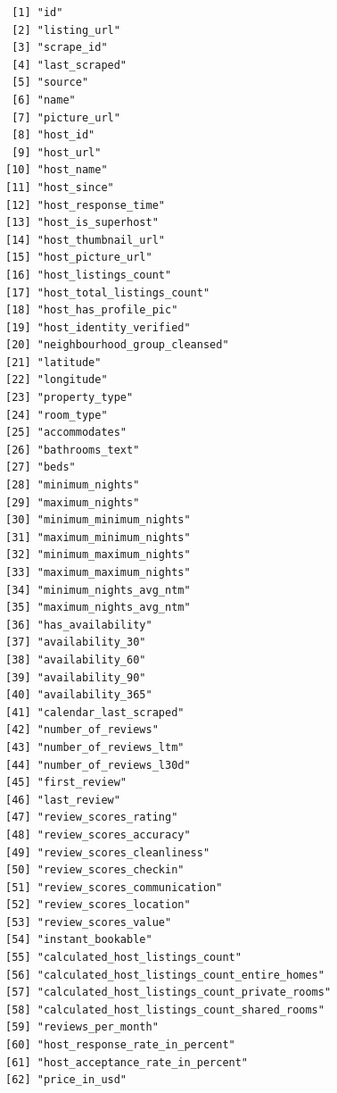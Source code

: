 \documentclass[
  journal,
]{IEEEtran}%
\begin{document}
\begin{verbatim}
 [1] "id"                                          
 [2] "listing_url"                                 
 [3] "scrape_id"                                   
 [4] "last_scraped"                                
 [5] "source"                                      
 [6] "name"                                        
 [7] "picture_url"                                 
 [8] "host_id"                                     
 [9] "host_url"                                    
[10] "host_name"                                   
[11] "host_since"                                  
[12] "host_response_time"                          
[13] "host_is_superhost"                           
[14] "host_thumbnail_url"                          
[15] "host_picture_url"                            
[16] "host_listings_count"                         
[17] "host_total_listings_count"                   
[18] "host_has_profile_pic"                        
[19] "host_identity_verified"                      
[20] "neighbourhood_group_cleansed"                
[21] "latitude"                                    
[22] "longitude"                                   
[23] "property_type"                               
[24] "room_type"                                   
[25] "accommodates"                                
[26] "bathrooms_text"                              
[27] "beds"                                        
[28] "minimum_nights"                              
[29] "maximum_nights"                              
[30] "minimum_minimum_nights"                      
[31] "maximum_minimum_nights"                      
[32] "minimum_maximum_nights"                      
[33] "maximum_maximum_nights"                      
[34] "minimum_nights_avg_ntm"                      
[35] "maximum_nights_avg_ntm"                      
[36] "has_availability"                            
[37] "availability_30"                             
[38] "availability_60"                             
[39] "availability_90"                             
[40] "availability_365"                            
[41] "calendar_last_scraped"                       
[42] "number_of_reviews"                           
[43] "number_of_reviews_ltm"                       
[44] "number_of_reviews_l30d"                      
[45] "first_review"                                
[46] "last_review"                                 
[47] "review_scores_rating"                        
[48] "review_scores_accuracy"                      
[49] "review_scores_cleanliness"                   
[50] "review_scores_checkin"                       
[51] "review_scores_communication"                 
[52] "review_scores_location"                      
[53] "review_scores_value"                         
[54] "instant_bookable"                            
[55] "calculated_host_listings_count"              
[56] "calculated_host_listings_count_entire_homes" 
[57] "calculated_host_listings_count_private_rooms"
[58] "calculated_host_listings_count_shared_rooms" 
[59] "reviews_per_month"                           
[60] "host_response_rate_in_percent"               
[61] "host_acceptance_rate_in_percent"             
[62] "price_in_usd"                                
\end{verbatim}
\end{document}
